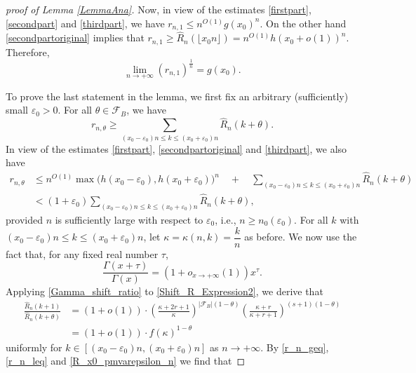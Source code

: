 \documentclass[11pt]{amsart}
\numberwithin{equation}{section}
\begin{document}
\begin{proof}[proof of Lemma \ref{LemmaAna}]
\smallskip

Now, in view of  the estimates \eqref{firstpart}, \eqref{secondpart} and \eqref{thirdpart}, we have
$r_{n,1} \leqslant n^{O(1)} g(x_0)^n$. On the other hand \eqref{secondpartoriginal} implies that $r_{n,1} \geqslant \widehat{R}_{n}(\lfloor x_0n \rfloor) = n^{O(1)}h\left(x_0 + o(1)\right)^n$. Therefore,
\[\lim_{n \rightarrow +\infty} \left(r_{n,1}\right)^{\frac{1}{n}} = g(x_0).\]

To prove the last statement in the lemma, we first fix an arbitrary (sufficiently) small $\varepsilon_0 > 0$. For all $\theta \in \mathcal{F}_B$, we have
\begin{equation}\label{r_n_geq}
r_{n,\theta} \geqslant \sum_{(x_0 - \varepsilon_0)n \leqslant k \leqslant (x_0 + \varepsilon_0)n} \widehat{R}_{n}(k+\theta).
\end{equation}
In view of the estimates \eqref{firstpart}, \eqref{secondpartoriginal} and \eqref{thirdpart}, we also have
\begin{align}
r_{n,\theta} &\leqslant n^{O(1)}\max\big( h(x_0 - \varepsilon_0), h(x_0 + \varepsilon_0) \big)^n \quad + \quad  \sum_{(x_0 - \varepsilon_0)n \leqslant k \leqslant (x_0 + \varepsilon_0)n} \widehat{R}_{n}(k+\theta) \nonumber\\
&< (1+\varepsilon_0) \sum_{(x_0 - \varepsilon_0)n \leqslant k \leqslant (x_0 + \varepsilon_0)n} \widehat{R}_{n}(k+\theta), \label{r_n_leq}
\end{align}
provided $n$ is sufficiently large with respect to $\varepsilon_0$, i.e., $n \geqslant n_0(\varepsilon_0)$. For all $k$ with $(x_0 - \varepsilon_0)n \leqslant k \leqslant (x_0 + \varepsilon_0)n$, let $\kappa = \kappa(n,k) = \dfrac{k}{n}$ as before. We now use the fact that, for any fixed real number $\tau$,
\begin{equation}\label{Gamma_shift_ratio}
\dfrac{\Gamma(x+\tau)}{\Gamma(x)} = \left( 1+o_{x \rightarrow +\infty}(1) \right) x^{\tau} .
\end{equation}
Applying \eqref{Gamma_shift_ratio} to \eqref{Shift_R_Expression2}, we derive that
\begin{align}
\frac{\widehat{R}_{n}(k+1)}{\widehat{R}_{n}(k+\theta)} &= \left( 1+o(1) \right) \cdot \left( \frac{\kappa + 2r + 1}{\kappa} \right)^{|\mathcal{F}_B| (1-\theta)}\left( \frac{\kappa + r}{\kappa + r+1} \right)^{(s+1)(1-\theta)} \nonumber \\
&= \left( 1+o(1) \right) \cdot f(\kappa)^{1 - \theta} \label{R_x0_pmvarepsilon_n}
\end{align}
uniformly for $k \in [(x_0 - \varepsilon_0)n , (x_0 + \varepsilon_0)n]$ as $n \rightarrow +\infty$. By \eqref{r_n_geq}, \eqref{r_n_leq} and \eqref{R_x0_pmvarepsilon_n} we find that

\end{proof}
\end{document}
